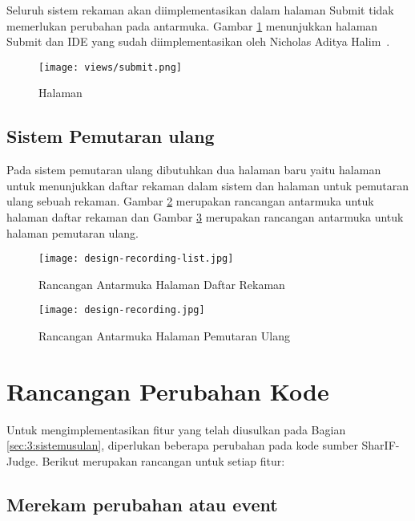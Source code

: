 Seluruh sistem rekaman akan diimplementasikan dalam halaman Submit tidak memerlukan perubahan pada antarmuka. Gambar \ref{fig:4:1:submit} menunjukkan halaman Submit dan IDE yang sudah diimplementasikan oleh Nicholas Aditya Halim~\cite{nicholas:sharif}.

\vspace{0.75cm}

\begin{figure}[H]
    \centering
    \texttt{[image: views/submit.png]}
    \caption{Halaman}
    \label{fig:4:1:submit}
\end{figure}

\subsection{Sistem Pemutaran ulang}
\label{sub:4:1:pemutaranulang}

Pada sistem pemutaran ulang dibutuhkan dua halaman baru yaitu halaman untuk menunjukkan daftar rekaman dalam sistem dan halaman untuk pemutaran ulang sebuah rekaman. Gambar \ref{fig:4:1:listrec} merupakan rancangan antarmuka untuk halaman daftar rekaman dan Gambar \ref{fig:4:1:rec} merupakan rancangan antarmuka untuk halaman pemutaran ulang.

\begin{figure}[H]
    \centering
    \texttt{[image: design-recording-list.jpg]}
    \caption{Rancangan Antarmuka Halaman Daftar Rekaman}
    \label{fig:4:1:listrec}
\end{figure}

\begin{figure}[H]
    \centering
    \texttt{[image: design-recording.jpg]}
    \caption{Rancangan Antarmuka Halaman Pemutaran Ulang}
    \label{fig:4:1:rec}
\end{figure}

\section{Rancangan Perubahan Kode}

Untuk mengimplementasikan fitur yang telah diusulkan pada Bagian \ref{sec:3:sistemusulan}, diperlukan beberapa perubahan pada kode sumber SharIF-Judge. Berikut merupakan rancangan untuk setiap fitur:

\subsection{Merekam perubahan atau event}
\label{sub:4:3:merekam}

